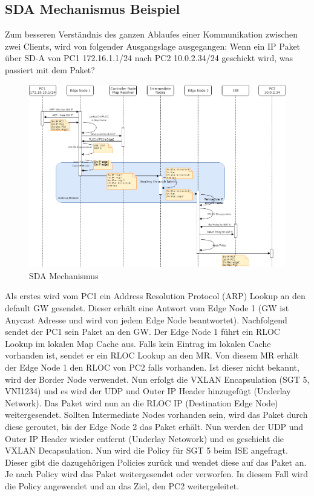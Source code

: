 \subsection{SDA Mechanismus Beispiel}
Zum besseren Verständnis des ganzen Ablaufes einer Kommunikation zwischen zwei Clients, wird von folgender Ausgangslage ausgegangen: Wenn ein IP Paket über SD-A von PC1 172.16.1.1/24 nach PC2 10.0.2.34/24 geschickt wird, was passiert mit dem Paket?

\begin{figure}[H]
	\centering
	\includegraphics[width=16cm]{img/SDA_Mechanismus-NewVersion.png}
	\caption{SDA Mechanismus}
	\label{fig:SDA Mechanismus}
\end{figure}

Als erstes wird vom PC1 ein Address Resolution Protocol (ARP) Lookup an den default GW gesendet. Dieser erhält eine Antwort vom Edge Node 1 (GW ist Anycast Adresse und wird von jedem Edge Node beantwortet). Nachfolgend sendet der PC1 sein Paket an den GW. Der Edge Node 1 führt ein RLOC Lookup im lokalen Map Cache aus. Falls kein Eintrag im lokalen Cache vorhanden ist, sendet er ein RLOC Lookup an den MR. Von diesem MR erhält der Edge Node 1 den RLOC von PC2 falls vorhanden. Ist dieser nicht bekannt, wird der Border Node verwendet. Nun erfolgt die VXLAN Encapsulation (SGT 5, VNI1234) und es wird der UDP und Outer IP Header hinzugefügt (Underlay Network). Das Paket wird nun an die RLOC IP (Destination Edge Node) weitergesendet. Sollten Intermediate Nodes vorhanden sein, wird das Paket durch diese geroutet, bis der Edge Node 2 das Paket erhält. Nun werden der UDP und Outer IP Header wieder entfernt (Underlay Netowork) und es geschieht die VXLAN Decapsulation. Nun wird die Policy für SGT 5 beim ISE angefragt. Dieser gibt die dazugehörigen Policies zurück und wendet diese auf das Paket an. Je nach Policy wird das Paket weitergesendet oder verworfen. In diesem Fall wird die Policy angewendet und an das Ziel, den PC2 weitergeleitet.



